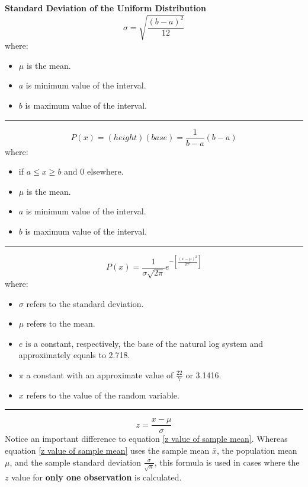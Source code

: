 \documentclass[	DIV=calc,%
							paper=a4,%
							fontsize=11pt,%
							twocolumn]{scrartcl} %
\newcommand{\hformbar}[1]{\vspace{5pt}\hrule\vspace{10pt}} %
\newcommand{\formdesc}[1]{\noindent\textbf{#1}}
\begin{document}
\formdesc{Standard Deviation of the Uniform Distribution}
\begin{equation}
\label{standard deviation of the uniform distribution}
\sigma = \sqrt{\frac{(b - a)^2}{12}}
\end{equation}
where: 
\begin{itemize}
 \item $\mu$ is the mean.
 \item $a$ is minimum value of the interval.
 \item $b$ is maximum value of the interval.
\end{itemize}
\hformbar


\formdesc{Uniform Distribution Probability}
\begin{equation}
\label{uniform distribution probability}
P(x) = (height)(base) = \frac{1}{b - a}(b-a)
\end{equation}
where: 
\begin{itemize}
 \item if $a \leq x \geq b$ and 0 elsewhere.
 \item $\mu$ is the mean.
 \item $a$ is minimum value of the interval.
 \item $b$ is maximum value of the interval.
\end{itemize}
\hformbar


\formdesc{Normal Probability Distribution}
\begin{equation}
\label{normal probability distribution}
P(x) = \frac{1}{\sigma\sqrt{2\pi}}e^{-\left[\frac{(x - \mu)^2}{2\sigma^2}  \right]}
\end{equation}
where: 
\begin{itemize}
 \item $\sigma$ refers to the standard deviation.
 \item $\mu$ refers to the mean.
 \item $e$ is a constant, respectively, the base of the natural log system and approximately equals to 2.718.
 \item $\pi$ a constant with an approximate value of $\frac{22}{7}$ or 3.1416.
 \item $x$ refers to the value of the random variable.
\end{itemize}
\hformbar


\formdesc{Standard Normal Value (One Observation - $\sigma$ Known)}
\begin{equation}
\label{standard normal value}
z = \frac{x - \mu}{\sigma}
\end{equation}
Notice an important difference to equation \eqref{z value of sample mean}. Whereas equation \eqref{z value of sample mean} uses the sample mean $\bar{x}$, the population mean $\mu$, and the sample standard deviation $\frac{\sigma}{\sqrt{n}}$, this formula is used in cases where the $z$ value for \textbf{only one observation} is calculated.
\end{document}
